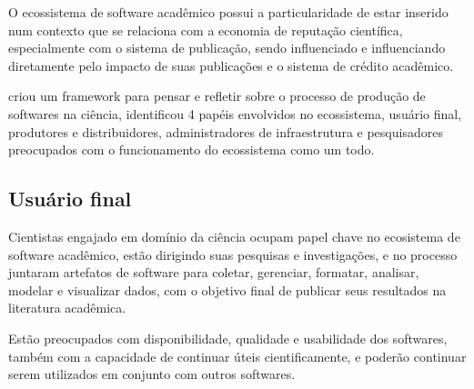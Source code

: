 O ecossistema de software acadêmico possui a particularidade de estar inserido
num contexto que se relaciona com a economia de reputação científica,
especialmente com o sistema de publicação, sendo influenciado e influenciando
diretamente pelo impacto de suas publicações e o sistema de crédito acadêmico.


 criou um framework para pensar e refletir
sobre o processo de produção de softwares na ciência, identificou 4 papéis
envolvidos no ecossistema, usuário final, produtores e distribuidores,
administradores de infraestrutura e pesquisadores preocupados com o
funcionamento do ecossistema como um todo.

%

\subsection{Usuário final}

Cientistas engajado em domínio da ciência ocupam papel chave no ecosistema de
software acadêmico, estão dirigindo suas pesquisas e investigações, e no
processo juntaram artefatos de software para coletar, gerenciar, formatar,
analisar, modelar e visualizar dados, com o objetivo final de publicar seus
resultados na literatura acadêmica.

Estão preocupados com disponibilidade, qualidade e usabilidade dos softwares,
também com a capacidade de continuar úteis cientificamente, e poderão continuar
serem utilizados em conjunto com outros softwares.

